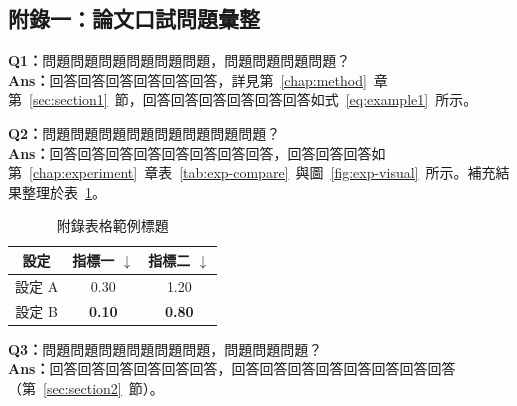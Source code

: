 \begin{ZhChapter}

\chapter*{附錄一：論文口試問題彙整}

\noindent\textbf{Q1：}問題問題問題問題問題問題，問題問題問題問題？\\
\noindent\textbf{Ans：}回答回答回答回答回答回答，詳見第~\ref{chap:method}~章第~\ref{sec:section1}~節，回答回答回答回答回答回答如式~\eqref{eq:example1}~所示。

\vspace{1.0em}

\noindent\textbf{Q2：}問題問題問題問題問題問題問題問題？\\
\noindent\textbf{Ans：}回答回答回答回答回答回答回答回答，回答回答回答如第~\ref{chap:experiment}~章表~\ref{tab:exp-compare}~與圖~\ref{fig:exp-visual}~所示。補充結果整理於表~\ref{tab:appendix1}。

\begin{table}[htbp]
    \centering
    \caption{附錄表格範例標題}
    \label{tab:appendix1}
    \renewcommand\arraystretch{1.2}
    \begin{tabular}{| c | c | c |}
        \hline
        設定 & 指標一 $\downarrow$ & 指標二 $\downarrow$ \\
        \hline
        設定 A & 0.30 & 1.20 \\
        設定 B & \textbf{0.10} & \textbf{0.80} \\
        \hline
    \end{tabular}
\end{table}

\vspace{1.0em}

\noindent\textbf{Q3：}問題問題問題問題問題問題，問題問題問題？\\
\noindent\textbf{Ans：}回答回答回答回答回答回答，回答回答回答回答回答回答回答回答（第~\ref{sec:section2}~節）。

\end{ZhChapter}
